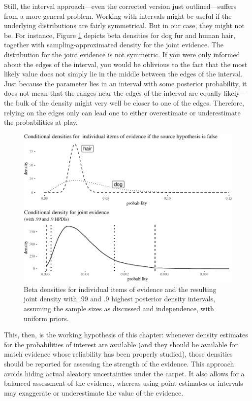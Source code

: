 \documentclass[
  10pt,
  dvipsnames,enabledeprecatedfontcommands]{scrartcl}
\begin{document}
Still, the interval approach---even the corrected version just
outlined---suffers from a more general problem. Working with intervals
might be useful if the underlying distributions are fairly symmetrical.
But in our case, they might not be. For instance, Figure
\ref{fig:densities} depicts beta densities for dog fur and human hair,
together with sampling-approximated density for the joint evidence. The
distribution for the joint evidence is not symmetric. If you were only
informed about the edges of the interval, you would be oblivious to the
fact that the most likely value does not simply lie in the middle
between the edges of the interval. Just because the parameter lies in an
interval with some posterior probability, it does not mean that the
ranges near the edges of the interval are equally likely---the bulk of
the density might very well be closer to one of the edges. Therefore,
relying on the edges only can lead one to either overestimate or
underestimate the probabilities at play.

\begin{figure}[H]

\begin{center}\includegraphics[width=0.8\linewidth]{chapter-outline_files/figure-latex/fig:densities-1} \end{center}
\caption{Beta densities for individual items of evidence and the resulting joint density with .99 and .9 highest posterior density intervals, assuming the sample sizes as discussed and independence, with uniform priors.}
\label{fig:densities}
\end{figure}

This, then, is the working hypothesis of this chapter: whenever density
estimates for the probabilities of interest are available (and they
should be available for match evidence whose reliability has been
properly studied), those densities should be reported for assessing the
strength of the evidence. This approach avoids hiding actual aleatory
uncertainties under the carpet. It also allows for a balanced assessment
of the evidence, whereas using point estimates or intervals may
exaggerate or underestimate the value of the evidence.
\end{document}
